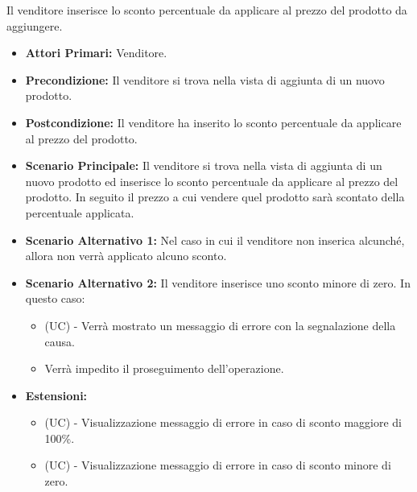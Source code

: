 Il venditore inserisce lo sconto percentuale da applicare al prezzo del prodotto da aggiungere.
\begin{itemize}
    \item \textbf{Attori Primari:} Venditore.
    \item \textbf{Precondizione:} Il venditore si trova nella vista di aggiunta di un nuovo prodotto.
    \item \textbf{Postcondizione:} Il venditore ha inserito lo sconto percentuale da applicare al prezzo del prodotto.
    \item \textbf{Scenario Principale:} Il venditore si trova nella vista di aggiunta di un nuovo prodotto ed inserisce lo sconto percentuale da applicare al prezzo del prodotto. In seguito il prezzo a cui vendere quel prodotto sarà scontato della percentuale applicata.
    \item \textbf{Scenario Alternativo 1:} Nel caso in cui il venditore non inserica alcunché, allora non verrà applicato alcuno sconto. 
    \item \textbf{Scenario Alternativo 2:} Il venditore inserisce uno sconto minore di zero. In questo caso:
    \begin{itemize}
        \item (UC) - Verrà mostrato un messaggio di errore con la segnalazione della causa.
        \item Verrà impedito il proseguimento dell'operazione.
    \end{itemize}
    \item \textbf{Estensioni:}
    \begin{itemize}
        \item (UC) - Visualizzazione messaggio di errore in caso di sconto maggiore di 100\%.
        \item (UC) - Visualizzazione messaggio di errore in caso di sconto minore di zero.
    \end{itemize}
\end{itemize}

